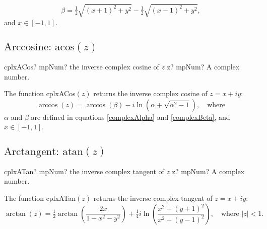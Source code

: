 \begin{equation}
	\label{complexBeta}
	\beta = \tfrac{1}{2} \sqrt{(x+1)^2 + y^2} - \tfrac{1}{2} \sqrt{(x-1)^2 + y^2},
\end{equation}
and $x \in [-1,1]$.






\newpage
\subsection{\texorpdfstring{$\text{Arccosine: acos}(z)$}{acos}}
\label{inverse complex cosine}

\begin{mpFunctionsExtract}
	\mpFunctionOne
	{cplxACos? mpNum? the inverse complex cosine of $z$}
	{z? mpNum? A complex number.}
\end{mpFunctionsExtract}

\vspace{0.3cm}
The function \textsf{cplxACos$(z)$} returns the inverse complex cosine of $z=x+iy$: 
\begin{equation}
	\arccos(z) = \arccos(\beta) - i \ln \left(\alpha + \sqrt{\alpha^2 -1}\right), \quad \text{where}
\end{equation}
$\alpha$ and $\beta$ are defined in equations \ref{complexAlpha} and \ref{complexBeta}, and $x \in [-1,1]$. 






\newpage
\subsection{\texorpdfstring{$\text{Arctangent: atan}(z)$}{atan}}
\label{inverse complex tangent}

\begin{mpFunctionsExtract}
	\mpFunctionOne
	{cplxATan? mpNum? the inverse complex tangent of $z$}
	{z? mpNum? A complex number.}
\end{mpFunctionsExtract}

\vspace{0.3cm}
The function \textsf{cplxATan$(z)$} returns the inverse complex tangent of $z=x+iy$: 
\begin{equation}
	\arctan(z) = \tfrac{1}{2}\arctan \left(\frac{2x}{1-x^2-y^2}\right) + \tfrac{1}{4} i \ln \left(\frac{x^2+(y+1)^2}{x^2+(y-1)^2}\right), \quad \text{where } |z|<1.
\end{equation}









